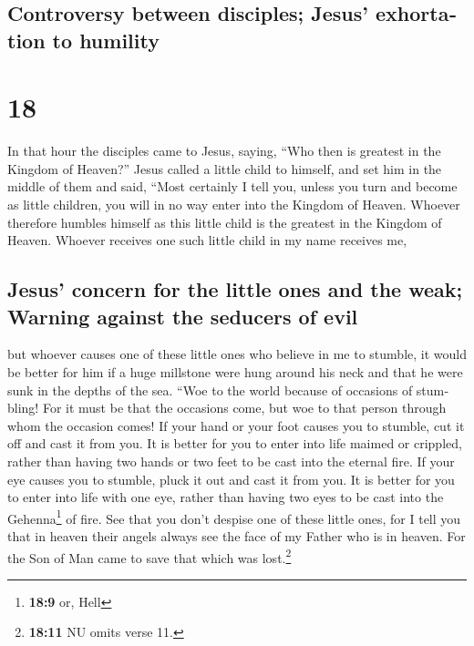 \begin{paracol}{2}
\begin{otherlanguage}{english}
{\subsection{Controversy between disciples; Jesus' exhortation to
humility}\label{controversy-between-disciples-jesus-exhortation-to-humility}}

\hypertarget{section-35}{%
\section{18}\label{section-35}}

 In that hour the disciples came to Jesus, saying, ``Who
then is greatest in the Kingdom of Heaven?''  Jesus called
a little child to himself, and set him in the middle of them
 and said, ``Most certainly I tell you, unless you turn
and become as little children, you will in no way enter into the Kingdom
of Heaven.  Whoever therefore humbles himself as this
little child is the greatest in the Kingdom of Heaven. 
Whoever receives one such little child in my name receives me,

\hypertarget{jesus-concern-for-the-little-ones-and-the-weak-warning-against-the-seducers-of-evil}{%
\subsection{Jesus' concern for the little ones and the weak; Warning
against the seducers of
evil}\label{jesus-concern-for-the-little-ones-and-the-weak-warning-against-the-seducers-of-evil}}

 but whoever causes one of these little ones who believe
in me to stumble, it would be better for him if a huge millstone were
hung around his neck and that he were sunk in the depths of the sea.
 ``Woe to the world because of occasions of stumbling! For
it must be that the occasions come, but woe to that person through whom
the occasion comes!  If your hand or your foot causes you
to stumble, cut it off and cast it from you. It is better for you to
enter into life maimed or crippled, rather than having two hands or two
feet to be cast into the eternal fire.  If your eye causes
you to stumble, pluck it out and cast it from you. It is better for you
to enter into life with one eye, rather than having two eyes to be cast
into the Gehenna\footnote{\textbf{18:9} or, Hell} of fire.
 See that you don't despise one of these little ones, for
I tell you that in heaven their angels always see the face of my Father
who is in heaven.  For the Son of Man came to save that
which was lost.\footnote{\textbf{18:11} NU omits verse 11.}


\end{otherlanguage}
\end{paracol}
